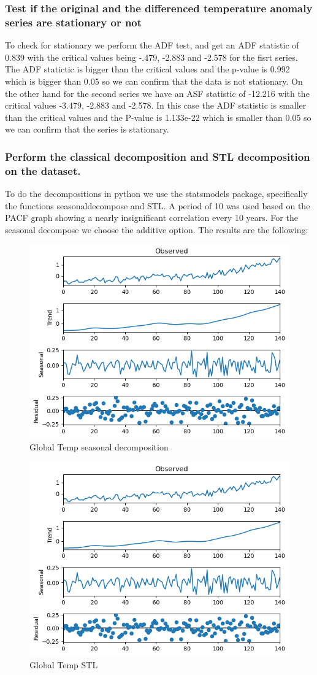 \documentclass{article}
\begin{document}
 \subsubsection{Test if the original and the differenced temperature anomaly series are stationary or not}
 
 To check for stationary we perform the ADF test, and get an ADF statistic of 0.839 with the critical values being -.479, -2.883 and -2.578 for the fisrt series. The ADF statictic is bigger than the critical values and the p-value is 0.992 which is bigger than 0.05 so we can confirm that the data is not stationary. 
 On the other hand for the second series we have an ASF statistic of -12.216 with the critical values -3.479, -2.883 and -2.578. In this case the ADF statistic is smaller than the critical values and the P-value is 1.133e-22 which is smaller than 0.05 so we can confirm that the series is stationary.
 \subsubsection{Perform the classical decomposition and STL decomposition on the dataset.}
 To do the decompositions in python we use the statsmodels package, specifically the functions seasonaldecompose and STL. A period of 10 was used based on the PACF graph showing a nearly insignificant correlation every 10 years. For the seasonal decompose we choose the additive option. The results are the following:
 
    \begin{figure}[H]
    \centering
    \includegraphics[width=0.4\linewidth]{img/global_temp/seasonal_decomp.png}
    \caption{Global Temp seasonal decomposition}
    \label{fig:global_temp_decomp}
    \end{figure}
    \begin{figure}[H]
    \centering
    \includegraphics[width=0.4\linewidth]{img/global_temp/stl.png}
    \caption{Global Temp STL}
    \label{fig:global_temp_stl}
    \end{figure}
    
\end{document}
